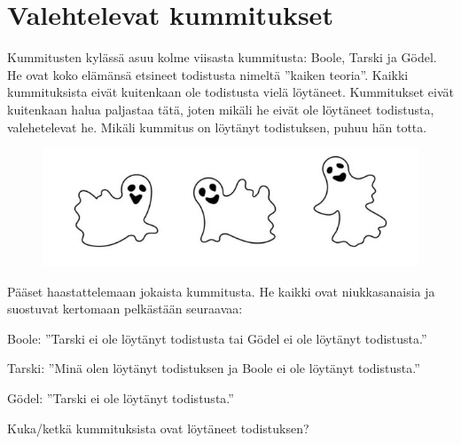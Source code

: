 \clearpage

\section{Valehtelevat kummitukset}

Kummitusten kylässä asuu kolme viisasta kummitusta: Boole, Tarski ja Gödel. He ovat koko elämänsä etsineet todistusta nimeltä ''kaiken teoria''. Kaikki kummituksista eivät kuitenkaan ole todistusta vielä löytäneet. Kummitukset eivät kuitenkaan halua paljastaa tätä, joten mikäli he eivät ole löytäneet todistusta, valehetelevat he. Mikäli kummitus on löytänyt todistuksen, puhuu hän totta. 

\begin{figure}[h]
    \begin{center}
    \includegraphics[width=0.5\linewidth]{kuvat/kolme_kummitusta.jpg}
    \end{center}
\end{figure}

Pääset haastattelemaan jokaista kummitusta. He kaikki ovat niukkasanaisia ja suostuvat kertomaan pelkästään seuraavaa:

Boole: ''Tarski ei ole löytänyt todistusta tai Gödel ei ole löytänyt todistusta.''

Tarski: ''Minä olen löytänyt todistuksen ja Boole ei ole löytänyt todistusta.''

Gödel: ''Tarski ei ole löytänyt todistusta.''


Kuka/ketkä kummituksista ovat löytäneet todistuksen?
